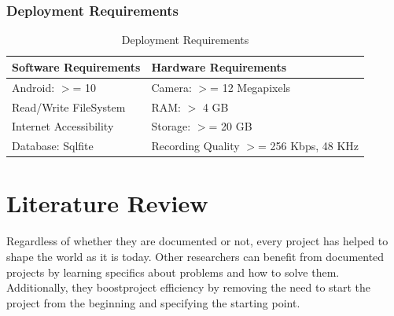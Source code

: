 \subsection{Deployment Requirements}
\begin{table}[ht]
    \centering
    \caption{Deployment Requirements}
    \begin{tabular}{|l|l|}
        \hline
        \textbf{Software Requirements} & \textbf{Hardware Requirements}            \\ \hline
        Android: \(>\)= 10             & Camera: \(>\)= 12 Megapixels              \\ \hline
        Read/Write FileSystem          & RAM: \(>\) 4 GB                           \\ \hline
        Internet Accessibility         & Storage: \(>\)= 20 GB                     \\ \hline
        Database: Sqlfite              & Recording Quality \(>\)= 256 Kbps, 48 KHz \\ \hline
    \end{tabular}
\end{table}

\chapter{Literature Review}

Regardless of whether they are documented or not, every project has helped to
shape the world as it is today. Other researchers can benefit from documented
projects by learning specifics about problems and how to solve them.
Additionally, they boostproject efficiency by removing the need to start the
project from the beginning and specifying the starting point.

